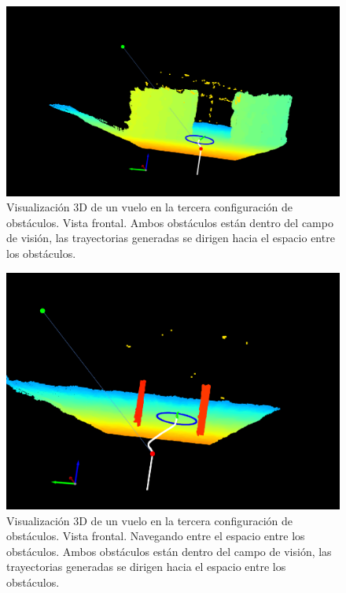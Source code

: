 \begin{figure}[H]
    \centering
    \includegraphics[scale=0.25]{partes/ImgJoao/depth-parallel-2-front.png}
    \caption[Visualización 3D de un vuelo en la tercera configuración de obstáculos. Vista frontal.]{Visualización 3D de un vuelo en la tercera configuración de obstáculos. Vista frontal. Ambos obstáculos están dentro del campo de visión, las trayectorias generadas se dirigen hacia el espacio entre los obstáculos.}
    \label{fig:depth-parallel-2}
\end{figure}

\begin{figure}[H]
    \centering
    \includegraphics[scale=0.32]{partes/ImgJoao/depth-parallel-4-front-red.png}
    \caption[Visualización 3D de un vuelo en la tercera configuración de obstáculos. Vista frontal. Navegando entre el espacio entre los obstáculos.]{Visualización 3D de un vuelo en la tercera configuración de obstáculos. Vista frontal. Navegando entre el espacio entre los obstáculos. Ambos obstáculos están dentro del campo de visión, las trayectorias generadas se dirigen hacia el espacio entre los obstáculos.}
    \label{fig:depth-parallel-4}
\end{figure}

